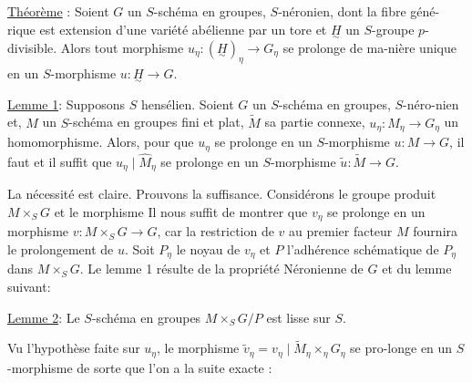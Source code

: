 \uline{Théorème} : Soient $G$ un $S$-schéma en groupes, $S$-néronien, \inserted{[}dont la fibre géné-rique est extension d'une variété abélienne par un tore\inserted{]} et $\underset{\sim}{H}$ un $S$-groupe $p$-divisible. Alors tout morphisme $u_\eta:(\underset{\sim}{H})_\eta\longrightarrow G_\eta$ se prolonge de ma-nière unique en un $S$-morphisme $u:\underset{\sim}{H}\longrightarrow G$.

\uline{Lemme 1}: Supposons $S$ hensélien. Soient $G$ un $S$-schéma en groupes, $S$-néro-nien et, $M$ un $S$-schéma en groupes fini et plat, $\widetilde M$ sa partie connexe,  $u_\eta:M_\eta\longrightarrow G_\eta$ un homomorphisme. Alors, pour que $u_\eta$ se prolonge en un $S$-morphisme $u:M\longrightarrow G$, il faut et il suffit que $u_\eta\mid\widehat M_\eta$ se prolonge en un $S$-morphisme $\widetilde u:\widetilde M\longrightarrow G$.

La nécessité est claire. Prouvons la suffisance. Considérons le groupe produit $M\times_SG$ et le morphisme
Il nous suffit de montrer que $v_\eta$ se prolonge en un morphisme $v:M\times_SG\longrightarrow G$, car la restriction de $v$ au premier facteur $M$ fournira le prolongement de $u$. Soit $P_\eta$ le noyau de $v_\eta$ et $P$ l'adhérence schématique de $P_\eta$ dans $M\times_SG$. Le lemme 1 résulte de la propriété Néronienne de $G$ et du lemme suivant:

\uline{Lemme 2}: Le $S$-schéma en groupes $M\times_SG/P$  est lisse sur $S$.

Vu l'hypothèse faite sur $u_\eta$, le morphisme $\widetilde v_\eta=v_\eta\mid\widetilde M_\eta\times_\eta G_\eta$ se pro-longe en un $S$-morphisme
de sorte que l'on a la suite exacte :

